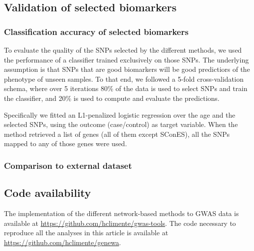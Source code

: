 \documentclass{article}
\begin{document}
 \cite{azencott_efficient_2013}


\subsection{Validation of selected biomarkers}

\subsubsection{Classification accuracy of selected biomarkers}

To evaluate the quality of the SNPs selected by the different methods, we used
the performance of a classifier trained exclusively on those SNPs. The
underlying assumption is that SNPs that are good biomarkers will be good
predictiors of the phenotype of unseen samples. To that end, we followed a
5-fold cross-validation schema, where over 5 iterations 80\% of the data is used
to select SNPs and train the classifier, and 20\% is used to compute and
evaluate the predictions.

Specifically we fitted an L1-penalized logistic regression over the age and the selected SNPs, using the outcome (case/control) as
target variable. When the method retrieved a list of genes (all of them except
SConES), all the SNPs mapped to any of those genes were used.

\subsubsection{Comparison to external dataset}

\subsection{Code availability}

The implementation of the different network-based methods to GWAS data is
available at \url{https://github.com/hclimente/gwas-tools}. The code necessary
to reproduce all the analyses in this article is available at \url{https://github.com/hclimente/genewa}.



\end{document}
